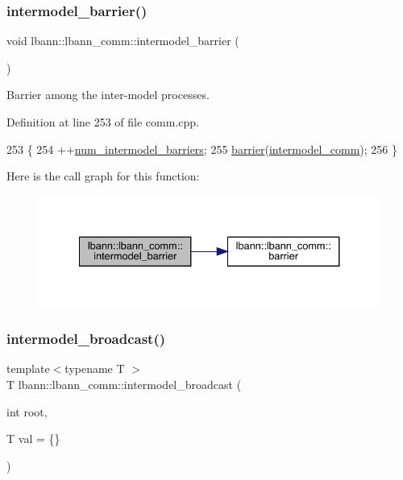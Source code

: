 \subsubsection{\texorpdfstring{intermodel\+\_\+barrier()}{intermodel\_barrier()}}
{\footnotesize\ttfamily void lbann\+::lbann\+\_\+comm\+::intermodel\+\_\+barrier (\begin{DoxyParamCaption}{ }\end{DoxyParamCaption})}

Barrier among the inter-\/model processes. 

Definition at line 253 of file comm.\+cpp.


\begin{DoxyCode}
253                                     \{
254   ++\hyperlink{classlbann_1_1lbann__comm_a03d946ef5ea5d3b15351e78a2eed10fe}{num\_intermodel\_barriers};
255   \hyperlink{classlbann_1_1lbann__comm_a303c02c5a127f3ed21f12c9a71cc90a6}{barrier}(\hyperlink{classlbann_1_1lbann__comm_a2c51c5d8faf4f0ab4f43b892c55e597b}{intermodel\_comm});
256 \}
\end{DoxyCode}
Here is the call graph for this function\+:\nopagebreak
\begin{figure}[H]
\begin{center}
\leavevmode
\includegraphics[width=334pt]{classlbann_1_1lbann__comm_a5834e95e066313d9328b22e4a0ec8663_cgraph}
\end{center}
\end{figure}
\mbox{\label{classlbann_1_1lbann__comm_a158db6a85549d314be56806dcb442432}} 
\subsubsection{\texorpdfstring{intermodel\+\_\+broadcast()}{intermodel\_broadcast()}}
{\footnotesize\ttfamily template$<$typename T $>$ \\
T lbann\+::lbann\+\_\+comm\+::intermodel\+\_\+broadcast (\begin{DoxyParamCaption}\item[{int}]{root,  }\item[{T}]{val = {\ttfamily \{\}} }\end{DoxyParamCaption})\hspace{0.3cm}{\ttfamily [inline]}}

